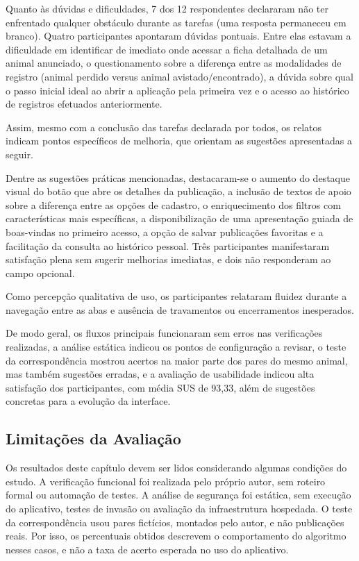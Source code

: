 Quanto às dúvidas e dificuldades, 7 dos 12 respondentes declararam não ter enfrentado qualquer obstáculo durante as tarefas (uma resposta permaneceu em branco). Quatro participantes apontaram dúvidas pontuais. Entre elas estavam a dificuldade em identificar de imediato onde acessar a ficha detalhada de um animal anunciado, o questionamento sobre a diferença entre as modalidades de registro (animal perdido versus animal avistado/encontrado), a dúvida sobre qual o passo inicial ideal ao abrir a aplicação pela primeira vez e o acesso ao histórico de registros efetuados anteriormente.

Assim, mesmo com a conclusão das tarefas declarada por todos, os relatos indicam pontos específicos de melhoria, que orientam as sugestões apresentadas a seguir.

Dentre as sugestões práticas mencionadas, destacaram-se o aumento do destaque visual do botão que abre os detalhes da publicação, a inclusão de textos de apoio sobre a diferença entre as opções de cadastro, o enriquecimento dos filtros com características mais específicas, a disponibilização de uma apresentação guiada de boas-vindas no primeiro acesso, a opção de salvar publicações favoritas e a facilitação da consulta ao histórico pessoal. Três participantes manifestaram satisfação plena sem sugerir melhorias imediatas, e dois não responderam ao campo opcional.

Como percepção qualitativa de uso, os participantes relataram fluidez durante a navegação entre as abas e ausência de travamentos ou encerramentos inesperados.

De modo geral, os fluxos principais funcionaram sem erros nas verificações realizadas, a análise estática indicou os pontos de configuração a revisar, o teste da correspondência mostrou acertos na maior parte dos pares do mesmo animal, mas também sugestões erradas, e a avaliação de usabilidade indicou alta satisfação dos participantes, com média SUS de 93,33, além de sugestões concretas para a evolução da interface.

\subsection{Limitações da Avaliação}

Os resultados deste capítulo devem ser lidos considerando algumas condições do estudo. A verificação funcional foi realizada pelo próprio autor, sem roteiro formal ou automação de testes. A análise de segurança foi estática, sem execução do aplicativo, testes de invasão ou avaliação da infraestrutura hospedada. O teste da correspondência usou pares fictícios, montados pelo autor, e não publicações reais. Por isso, os percentuais obtidos descrevem o comportamento do algoritmo nesses casos, e não a taxa de acerto esperada no uso do aplicativo.

